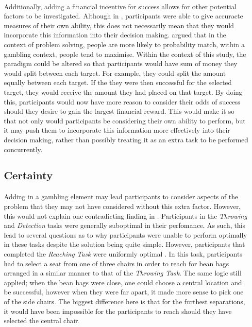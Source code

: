\documentclass[12pt]{article}
\begin{document}
\paragraph{} Additionally, adding a financial incentive for success allows for other potential factors to be investigated. Although in \cite{James2017}, participants were able to give accuracte measures of their own ability, this does not necessarily mean that they would incorporate this information into their decision making. \cite{Goodnow1955} argued that in the context of problem solving, people are more likely to probability match, within a gambling context, people tend to maximise. Within the context of this study, the paradigm could be altered so that participants would have sum of money they would split between each target. For example, they could split the amount equally between each target. If the they were then successful for the selected target, they would receive the amount they had placed on that target. By doing this, participants would now have more reason to consider their odds of success should they desire to gain the largest financial reward. This would make it so that not only would participants be considering their own ability to perform, but it may push them to incorporate this information more effectively into their decision making, rather than possibly treating it as an extra task to be performed concurrently.

\subsection*{Certainty}
\paragraph{} Adding in a gambling element may lead participants to consider aspects of the problem that they may not have considered without this extra factor. However, this would not explain one contradicting finding in \cite{clarke2015failure}. Participants in the \textit{Throwing} and \textit{Detection} tasks were generally suboptimal in their perfomance. As such, this lead to several questions as to why participants were unable to perform optimally in these tasks despite the solution being quite simple. However, participants that completed the \textit{Reaching Task} were uniformly optimal \citep{clarke2015failure}. In this task, participants had to select a seat from one of three chairs in order to reach for bean bags arranged in a similar manner to that of the \textit{Throwing Task}. The same logic still applied; when the bean bags were close, one could choose a central location and be successful, however when they were far apart, it made more sense to pick one of the side chairs. The biggest difference here is that for the furthest separations, it would have been impossible for the participants to reach should they have selected the central chair. 
\end{document}
